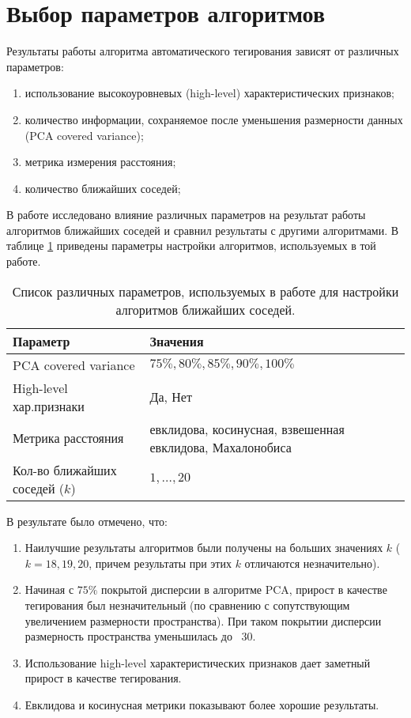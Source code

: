 \section{Выбор параметров алгоритмов}

Результаты работы алгоритма автоматического тегирования зависят от различных параметров:
\begin{enumerate}
 \item использование высокоуровневых (high-level) характеристических признаков;
 \item количество информации, сохраняемое после уменьшения размерности данных (PCA covered variance);
 \item метрика измерения расстояния;
 \item количество ближайших соседей;
\end{enumerate}

В работе \cite{msordo_thesis} исследовано влияние различных параметров на результат работы алгоритмов ближайших соседей 
и сравнил результаты с другими алгоритмами. В таблице \ref{tab:old_algo_settings} приведены параметры настройки алгоритмов, используемых в той работе.
\begin{table}[ht]
\centering
\captionsetup{justification=centering}
\caption{Список различных параметров, используемых в работе \cite{msordo_thesis} для настройки алгоритмов ближайших соседей.}
\label{tab:old_algo_settings}
\begin{tabular}{ p{5cm}  p{4cm} }
  \hline    
  Параметр & Значения \\
  \hline    
  PCA covered variance & $75\%, 80\%, 85\%, 90\%, 100\% $ \\
  High-level хар.признаки & Да, Нет \\
  Метрика расстояния & евклидова, косинусная, взвешенная евклидова, Махалонобиса\\
  Кол-во ближайших соседей ($k$) & $1, \ldots, 20$ \\
  \hline    
\end{tabular}
\end{table}

В результате \cite{msordo_thesis} было отмечено, что:
\begin{enumerate}
 \item Наилучшие результаты алгоритмов были получены на больших значениях $k$ ($k = 18, 19, 20$, причем результаты при этих $k$ отличаются незначительно).
 \item Начиная с $75\%$ покрытой дисперсии в алгоритме PCA, прирост в качестве тегирования был незначительный (по сравнению с сопутствующим увеличением размерности пространства).
 При таком покрытии дисперсии размерность пространства уменьшилась до ~30.
 \item Использование high-level характеристических признаков дает заметный прирост в качестве тегирования.
 \item Евклидова и косинусная метрики показывают более хорошие результаты.
\end{enumerate}


